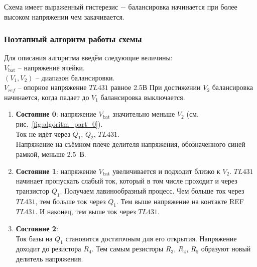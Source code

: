 Схема имеет выраженный гистерезис $-$ балансировка начинается при более высоком напряжении чем закачивается.


\subsubsection{Поэтапный алгоритм работы схемы}
Для описания алгоритма введём следующие величины: \\
$V_{\text{bat}}$ -- напряжение ячейки. \\
$(V_1, V_2)$ -- диапазон балансировки. \\
$V_{ref}$  -- опорное напряжение $TL431$ равное 2.5В
При достижении $V_2$ балансировка начинается, когда падает до $V_1$ балансировка выключается.

\begin{enumerate}
    \item \textbf{Состояние 0}: напряжение $V_{\text{bat}}$ значительно меньше $V_2$ (см. рис.~\ref{fig:algoritm_part_0}). \\
    Ток не идёт через $Q_1$, $Q_2$, $TL431$. \\
    Напряжение на съёмном плече делителя напряжения, обозначенного синей рамкой, меньше 2.5~В.

    \item \textbf{Состояние 1}: напряжение $V_{\text{bat}}$ увеличивается и подходит близко к $V_2$.
    $TL431$ начинает пропускать слабый ток, который в том числе проходит и через транзистор $Q_1$.
    Получаем лавинообразный процесс. Чем больше ток через $TL431$, тем больше ток через $Q_1$. 
    Тем выше напряжение на контакте REF $TL431$. И наконец, тем выше ток через $TL431$.

    \item \textbf{Состояние 2}: \\
    Ток базы на $Q_1$ становится достаточным для его открытия. Напряжение доходит до резистора $R_4$.
    Тем самым резисторы $R_3$, $R_4$, $R_5$ образуют новый делитель напряжения. 
    
\end{enumerate}


